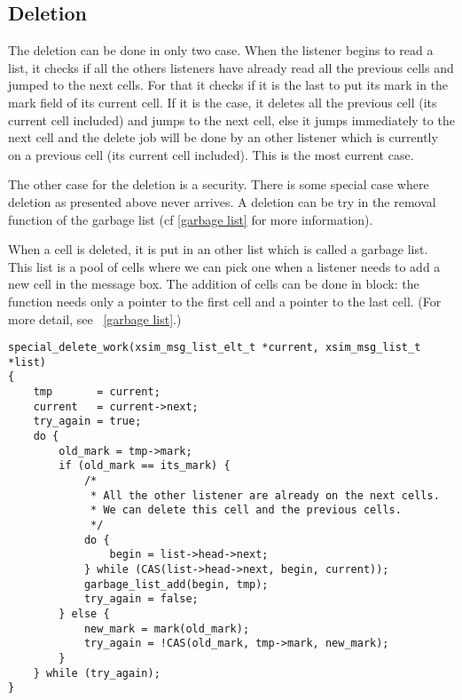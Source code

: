 \subsection{Deletion}
The deletion can be done in only two case. When the listener begins to read a list,
it checks if all the others listeners have already read all the previous cells and
jumped to the next cells. For that it checks if it is 
the last to put its mark in the mark field of its current cell. If it is the case,
it deletes all the previous cell (its current cell included) and jumps to the next
cell, else it jumps immediately to the next cell and the delete job will be done 
by an other listener which is currently on a previous cell (its current cell included).
This is the most current case.

The other case for the deletion is a security. There is some special case
where deletion as presented above never arrives. A deletion can be try in the removal 
function of the garbage list (cf \ref{garbage list} for more information).


When a cell is deleted, it is put in an other list which is called a garbage list.
This list is a pool of cells where we can pick one when a listener needs to add a 
new cell in the message box. The addition of cells
can be done in block: the function needs only a pointer to the first cell and a
pointer to the last cell. (For more detail, see ~\ref{garbage list}.)

\begin{verbatim}
special_delete_work(xsim_msg_list_elt_t *current, xsim_msg_list_t *list)
{
    tmp       = current;
    current   = current->next;
    try_again = true;
    do {
        old_mark = tmp->mark;
        if (old_mark == its_mark) {
            /* 
             * All the other listener are already on the next cells.
             * We can delete this cell and the previous cells.
             */
            do {
                begin = list->head->next;
            } while (CAS(list->head->next, begin, current));
            garbage_list_add(begin, tmp);
            try_again = false;
        } else {
            new_mark = mark(old_mark);
            try_again = !CAS(old_mark, tmp->mark, new_mark);
        }
    } while (try_again);
}
\end{verbatim}

